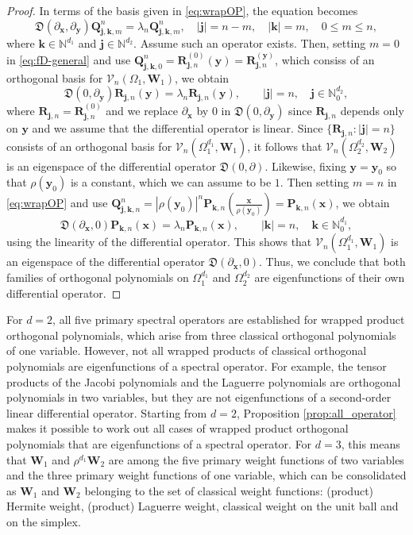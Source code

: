 \documentclass{amsart}
\theoremstyle{remark}
\def\fD{{\mathfrak D}}
\def\l{{\lambda}}
\def\jb{{\bm j}}
\def\kb{{\bm k}}
\def\xb{{\bm x}}
\def\yb{{\bm y}}
\def\Pb{{\bm P}}
\def\Qb{{\bm Q}}
\def\Rb{{\bm R}}
\def\Wb{{\bm W}}
\def\CV{{\mathcal V}}
\def\NN{{\mathbb N}}
\begin{document}
\begin{proof}
In terms of the basis given in \eqref{eq:wrapOP}, the equation becomes 
\begin{equation} \label{eq:fD-general}
    \fD (\partial_\xb, \partial_\yb) \Qb_{\jb,\kb,m}^n = \l_n \Qb_{\jb,\kb,m}^n, \quad |\jb| = n-m, \quad |\kb| =m, \quad 0 \le m \le n,  
\end{equation}
where $\kb \in \NN^{d_1}$ and $\jb \in \NN^{d_2}$. Assume such an operator exists. Then, setting $m = 0$ in 
\eqref{eq:fD-general} and use $\Qb_{\jb,\kb, 0}^n = \Rb_{\jb,n}^{(0)}(\yb) = \Rb_{\jb,n}^{(\yb)}$, which consiss of
an orthogonal basis for $\CV_n(\Omega_1, \Wb_1)$, we obtain 
$$
  \fD (0, \partial_\yb)  \Rb_{\jb,n}(\yb)= \l_n \Rb_{\jb, n}(\yb), \qquad |\jb| = n, \quad \jb \in \NN_0^{d_2}, 
$$
where $\Rb_{\jb,n} =\Rb_{\jb,n}^{(0)}$ and we replace $\partial_\xb$ by 0 in $\fD (0, \partial_\yb)$ since $\Rb_{\jb,n}$ 
depends only on $\yb$ and we assume that the differential operator is linear. Since $\{\Rb_{\jb,n}: |\jb|=n\}$
consists of an orthogonal basis for $\CV_n(\Omega_1^{d_1}, \Wb_1)$, it follows that $\CV_n(\Omega_2^{d_2}, \Wb_2)$ is
an eigenspace of the differential operator $\fD(0,\partial)$. Likewise, fixing $\yb=\yb_0$ so that $\rho(\yb_0)$ is a 
constant, which we can assume to be $1$. Then setting $m = n$ in \eqref{eq:wrapOP} and use 
$\Qb_{\jb,\kb, n}^n = |\rho(\yb_0)|^n \Pb_{\kb,n}(\frac{\xb}{\rho(\yb_0)})  = \Pb_{\kb,n}(\xb)$, we obtain 
$$
  \fD (\partial_\xb, 0) \Pb_{\kb,n}(\xb) = \l_n \Pb_{\kb, n}(\xb), \qquad |\kb| = n, \quad \kb \in \NN_0^{d_1},
$$
using the linearity of the differential operator. This shows that $\CV_n(\Omega_1^{d_1}, \Wb_1)$ is an eigenspace 
of the differential operator $\fD(\partial_\xb,0)$. Thus, we conclude that both families of orthogonal polynomials on 
$\Omega_1^{d_1}$ and $\Omega_2^{d_2}$ are eigenfunctions of their own differential operator. 
\end{proof}

For $d =2$, all five primary spectral operators are established for wrapped product orthogonal polynomials, 
which arise from three classical orthogonal polynomials of one variable. However, not all wrapped products of
classical orthogonal polynomials are eigenfunctions of a spectral operator. For example, the tensor products of 
the Jacobi polynomials and the Laguerre polynomials are orthogonal polynomials in two variables, but they
are not eigenfunctions of a second-order linear differential operator. Starting from $d = 2$, 
Proposition \ref{prop:all_operator} makes it possible to work out all cases of wrapped product orthogonal 
polynomials that are eigenfunctions of a spectral operator. For $d =3$, this means that $\Wb_1$ and 
$\rho^{d_1} \Wb_2$ are among the five primary weight functions of two variables and the three primary 
weight functions of one variable, which can be consolidated as $\Wb_1$ and $\Wb_2$ belonging to the set 
of classical weight functions: (product) Hermite weight, (product) Laguerre weight, classical weight on the 
unit ball and on the simplex. 
\end{document}
